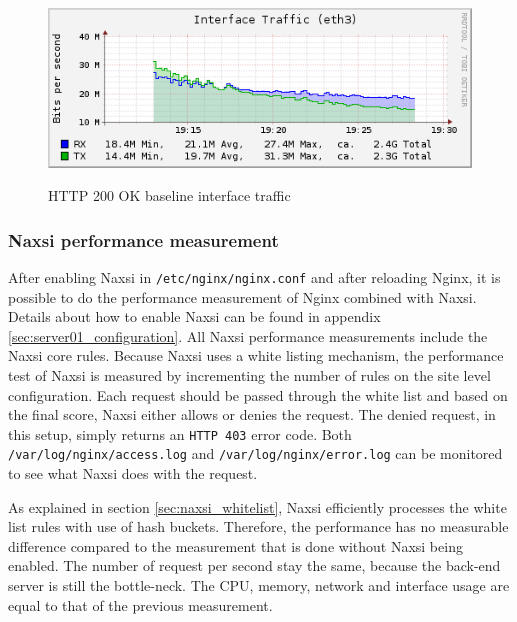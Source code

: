 \documentclass[Measurements]{subfiles}
\begin{document}
\begin{figure}[H]
\centering
\caption{HTTP 200 OK baseline interface traffic}
\includegraphics[scale=0.7]{images/results/200_with_naxsi_incremented_disallowed_parameters/interface.png}
\label{fig:Baseline Nginx interface traffic}
\end{figure}

\subsubsection{Naxsi performance measurement}


After enabling Naxsi in \verb+/etc/nginx/nginx.conf+ and after reloading Nginx, it is possible to do the performance measurement of Nginx combined with Naxsi. Details about how to enable Naxsi can be found in appendix \ref{sec:server01_configuration}. All Naxsi performance measurements include the Naxsi core rules. Because Naxsi uses a white listing mechanism, the performance test of Naxsi is measured by incrementing the number of rules on the site level configuration. Each request should be passed through the white list and based on the final score, Naxsi either allows or denies the request. The denied request, in this setup, simply returns an \verb+HTTP 403+ error code. Both \verb+/var/log/nginx/access.log+ and \verb+/var/log/nginx/error.log+ can be monitored to see what Naxsi does with the request.

As explained in section \ref{sec:naxsi_whitelist}, Naxsi efficiently processes the white list rules with use of hash buckets. Therefore, the performance has no measurable difference compared to the measurement that is done without Naxsi being enabled. The number of request per second stay the same, because the back-end server is still the bottle-neck. The CPU, memory, network and interface usage are equal to that of the previous measurement.
\end{document}
